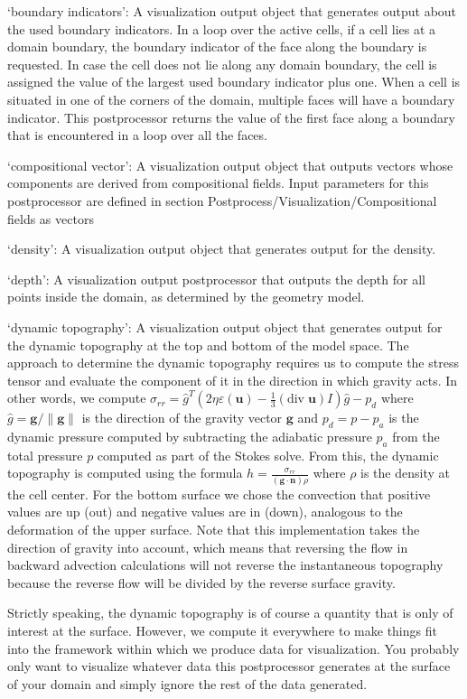 \begin{itemize}
`boundary indicators': A visualization output object that generates output about the used boundary indicators. In a loop over the active cells, if a cell lies at a domain boundary, the boundary indicator of the face along the boundary is requested. In case the cell does not lie along any domain boundary, the cell is assigned the value of the largest used boundary indicator plus one. When a cell is situated in one of the corners of the domain, multiple faces will have a boundary indicator. This postprocessor returns the value of the first face along a boundary that is encountered in a loop over all the faces. 

`compositional vector': A visualization output object that outputs vectors whose components are derived from compositional fields. Input parameters for this postprocessor are defined in section Postprocess/Visualization/Compositional fields as vectors

`density': A visualization output object that generates output for the density.

`depth': A visualization output postprocessor that outputs the depth for all points inside the domain, as determined by the geometry model.

`dynamic topography': A visualization output object that generates output for the dynamic topography at the top and bottom of the model space. The approach to determine the dynamic topography requires us to compute the stress tensor and evaluate the component of it in the direction in which gravity acts. In other words, we compute $\sigma_{rr}={\hat g}^T(2 \eta \varepsilon(\mathbf u)-\frac 13 (\textrm{div}\;\mathbf u)I)\hat g - p_d$ where $\hat g = \mathbf g/\|\mathbf g\|$ is the direction of the gravity vector $\mathbf g$ and $p_d=p-p_a$ is the dynamic pressure computed by subtracting the adiabatic pressure $p_a$ from the total pressure $p$ computed as part of the Stokes solve. From this, the dynamic topography is computed using the formula $h=\frac{\sigma_{rr}}{(\mathbf g \cdot \mathbf n)  \rho}$ where $\rho$ is the density at the cell center. For the bottom surface we chose the convection that positive values are up (out) and negative values are in (down), analogous to the deformation of the upper surface. Note that this implementation takes the direction of gravity into account, which means that reversing the flow in backward advection calculations will not reverse the instantaneous topography because the reverse flow will be divided by the reverse surface gravity.

Strictly speaking, the dynamic topography is of course a quantity that is only of interest at the surface. However, we compute it everywhere to make things fit into the framework within which we produce data for visualization. You probably only want to visualize whatever data this postprocessor generates at the surface of your domain and simply ignore the rest of the data generated.


\end{itemize}
